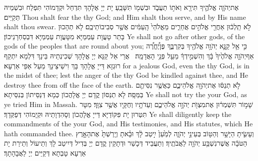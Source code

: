 {אֶת\maqqaf יְהֹוָ֧ה אֱלֹהֶ֛יךָ תִּירָ֖א וְאֹת֣וֹ תַעֲבֹ֑ד וּבִשְׁמ֖וֹ תִּשָּׁבֵֽעַ׃}
{יָת יְיָ אֶלָהָךְ תִּדְחַל וּקְדָמוֹהִי תִּפְלַח וּבִשְׁמֵיהּ תְּקַיֵּים׃}
{Thou shalt fear the \lord\space thy God; and Him shalt thou serve, and by His name shalt thou swear.}{}
{לֹ֣א תֵֽלְכ֔וּן אַחֲרֵ֖י אֱלֹהִ֣ים אֲחֵרִ֑ים מֵאֱלֹהֵי֙ הָֽעַמִּ֔ים אֲשֶׁ֖ר סְבִיבוֹתֵיכֶֽם׃}
{לָא תְהָכוּן בָּתַר טָעֲוָת עַמְמַיָּא מִטָּעֲוָת עַמְמַיָּא דִּבְסַחְרָנֵיכוֹן׃}
{Ye shall not go after other gods, of the gods of the peoples that are round about you;}{}
{כִּ֣י אֵ֥ל קַנָּ֛א יְהֹוָ֥ה אֱלֹהֶ֖יךָ בְּקִרְבֶּ֑ךָ פֶּן\maqqaf יֶ֠חֱרֶ֠ה אַף\maqqaf יְהֹוָ֤ה אֱלֹהֶ֙יךָ֙ בָּ֔ךְ וְהִשְׁמִ֣ידְךָ֔ מֵעַ֖ל פְּנֵ֥י הָאֲדָמָֽה׃ \setuma }
{אֲרֵי אֵל קַנָּא יְיָ אֱלָהָךְ שְׁכִינְתֵיהּ בֵּינָךְ דִּלְמָא יִתְקַף רוּגְזָא דַּייָ אֱלָהָךְ בָּךְ וִישֵׁיצֵינָךְ מֵעַל אַפֵּי אַרְעָא׃}
{for a jealous God, even the \lord\space thy God, is in the midst of thee; lest the anger of the \lord\space thy God be kindled against thee, and He destroy thee from off the face of the earth.}{}
{לֹ֣א תְנַסּ֔וּ אֶת\maqqaf יְהֹוָ֖ה אֱלֹהֵיכֶ֑ם כַּאֲשֶׁ֥ר נִסִּיתֶ֖ם בַּמַּסָּֽה׃}
{לָא תְנַסּוֹן קֳדָם יְיָ אֱלָהֲכוֹן כְּמָא דְּנַסֵּיתוֹן בְּנִסֵּיתָא׃}
{Ye shall not try the \lord\space your God, as ye tried Him in Massah.}{}
{שָׁמ֣וֹר תִּשְׁמְר֔וּן אֶת\maqqaf מִצְוֺ֖ת יְהֹוָ֣ה אֱלֹהֵיכֶ֑ם וְעֵדֹתָ֥יו וְחֻקָּ֖יו אֲשֶׁ֥ר צִוָּֽךְ׃}
{מִטָּר תִּטְּרוּן יָת פִּקּוֹדַיָּא דַּייָ אֱלָהֲכוֹן וְסָהִדְוָתֵיהּ וּקְיָמוֹהִי דְּפַקְּדָךְ׃}
{Ye shall diligently keep the commandments of the \lord\space your God, and His testimonies, and His statutes, which He hath commanded thee.}{}
{וְעָשִׂ֛יתָ הַיָּשָׁ֥ר וְהַטּ֖וֹב בְּעֵינֵ֣י יְהֹוָ֑ה לְמַ֙עַן֙ יִ֣יטַב לָ֔ךְ וּבָ֗אתָ וְיָֽרַשְׁתָּ֙ אֶת\maqqaf הָאָ֣רֶץ הַטֹּבָ֔ה אֲשֶׁר\maqqaf נִשְׁבַּ֥ע יְהֹוָ֖ה לַאֲבֹתֶֽיךָ׃}
{וְתַעֲבֵיד דְּכָשַׁר וּדְתָקֵין קֳדָם יְיָ בְּדִיל דְּיִיטַב לָךְ וְתֵיעוֹל וְתֵירַת יָת אַרְעָא טָבְתָא דְּקַיֵּים יְיָ לַאֲבָהָתָךְ׃}
